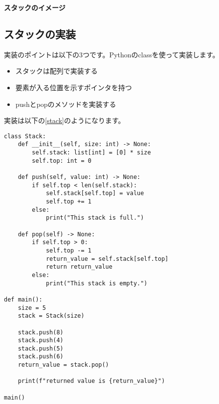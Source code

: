 \vspace{0.5cm}
\begin{center}
	\textbf{スタックのイメージ}
\end{center}
\vspace{0.5cm}

\subsection{スタックの実装}
実装のポイントは以下の3つです。Pythonのclassを使って実装します。
\begin{itemize}
	\item スタックは配列で実装する
	\item 要素が入る位置を示すポインタを持つ
	\item pushとpopのメソッドを実装する
\end{itemize}

実装は以下の\ref{stack}のようになります。

\begin{lstlisting}[caption=スタックの実装, label=stack, frame=TRBL, label={stack}]
	class Stack:
    def __init__(self, size: int) -> None:
        self.stack: list[int] = [0] * size
        self.top: int = 0
    
    def push(self, value: int) -> None:
        if self.top < len(self.stack):
            self.stack[self.top] = value
            self.top += 1
        else:
            print("This stack is full.")
    
    def pop(self) -> None:
        if self.top > 0:
            self.top -= 1
            return_value = self.stack[self.top]
            return return_value
        else:
            print("This stack is empty.")

def main():
    size = 5
    stack = Stack(size)
    
    stack.push(8)
    stack.push(4)
    stack.push(5)
    stack.push(6)
    return_value = stack.pop()
    
    print(f"returned value is {return_value}")
    
main()

\end{lstlisting}

